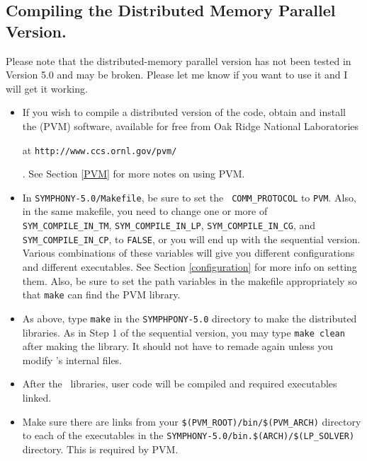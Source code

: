 \subsection{Compiling the Distributed Memory Parallel Version.}

Please note that the distributed-memory parallel version has not been tested
in Version 5.0 and may be broken. Please let me know if you want to use it and
I will get it working.

\begin{itemize}
        \item If you wish to compile a distributed version of the code, obtain
and install the {\em {}} (PVM) software, available for free
from Oak Ridge National Laboratories
\begin{latexonly}
        at {\tt http://www.ccs.ornl.gov/pvm/}
\end{latexonly}. 
        See Section \ref{PVM} for more notes on using PVM.
        
        \item In \texttt{SYMPHONY-5.0/Makefile}, be sure to set the {\tt
        COMM\_PROTOCOL} to {\tt PVM}. Also, in
        the same makefile, you need to change one or more of {\tt
        SYM\_COMPILE\_IN\_TM}, {\tt SYM\_COMPILE\_IN\_LP}, 
	{\tt SYM\_COMPILE\_IN\_CG}, and
        {\tt SYM\_COMPILE\_IN\_CP}, to {\tt FALSE}, or you will end up with the
        sequential version. Various combinations of these variables will give
        you different configurations and different executables. See Section
        \ref{configuration} for more info on setting them. Also, be sure to
        set the path variables in the makefile appropriately so that 
	\texttt{make} can find the PVM library.

        \item As above, type {\tt make} in the \texttt{SYMPHPONY-5.0} 
	directory to
        make the distributed libraries. As in Step 1 of the sequential
        version, you may type {\tt make clean} after making the
        library. It should not have to remade again unless you modify
        \BB's internal files.

        \item After the \BB\ libraries, user code will be compiled and
        required executables linked.

        \item Make sure there are links from your
        \texttt{\$(PVM\_ROOT)/bin/\$(PVM\_ARCH)} directory to each of the
        executables in the
        \texttt{SYMPHONY-5.0/bin.\$(ARCH)/\$(LP\_SOLVER)} directory. 
	This is required by PVM.


\end{itemize}
